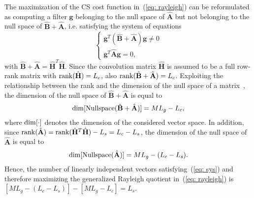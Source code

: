 \documentclass[10pt]{IEEEtran}
\begin{document}
The maximization of the CS cost function in~(\ref{eq: rayleigh}) can be reformulated as computing a filter $\mathbf{g}$ belonging to the null space of $\hat{\mathbf{A}}$ but not belonging to the null space of $\hat{\mathbf{B}} + \hat{\mathbf{A}}$, i.e. satisfying the system of equations
\begin{equation}
\label{eq: sys}
\begin{cases}
\mathbf{g}^T (\hat{\mathbf{B}} + \hat{\mathbf{A}})\mathbf{g} \neq 0 \\
\mathbf{g}^T\hat{\mathbf{A}} \mathbf{g} = 0,
\end{cases}
\end{equation}
 with $\hat{\mathbf{B}} + \hat{\mathbf{A}} = \hat{\mathbf{H}}^T\hat{\mathbf{H}}$.
Since the convolution matrix $\hat{\mathbf{H}}$ is assumed to be a full row-rank matrix with ${\rm rank}(\hat{\mathbf{H}}) = L_c$, also ${\rm rank}(\hat{\mathbf{B}} + \hat{\mathbf{A}}) = L_c$.
Exploiting the relationship between the rank and the dimension of the null space of a matrix~\cite{Golub_Matrix_book}, the dimension of the null space of $\hat{\mathbf{B}} + \hat{\mathbf{A}}$ is equal to
\begin{eqnarray}
{\rm dim}[{\rm Nullspace} (\hat{\mathbf{B}} + \hat{\mathbf{A}})] = ML_g - L_c,
\end{eqnarray}
where $\rm{dim}[ \cdot]$ denotes the dimension of the considered vector space.
In addition, since ${\rm rank}(\hat{\mathbf{A}}) = {\rm rank}(\hat{\mathbf{H}}^T \hat{\mathbf{H}}) - L_s = L_c - L_s$, the dimension of the null space of $\hat{\mathbf{A}}$ is equal to
\begin{eqnarray}
{\rm dim}[{\rm Nullspace} (\hat{\mathbf{A}})] = ML_g - (L_c - L_s).
\end{eqnarray}
Hence, the number of linearly independent vectors satisfying~(\ref{eq: sys}) and therefore maximizing the generalized Rayleigh quotient in~(\ref{eq: rayleigh}) is $[ML_g-(L_c-L_s)] - [ML_g-L_c] = L_s$.
\end{document}
